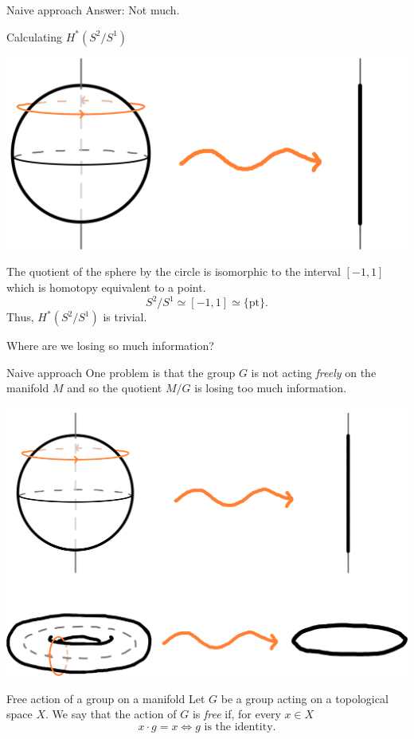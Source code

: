 \documentclass{beamer}
\begin{document}
\begin{frame}{Naive approach}
Answer: Not much.
\begin{exampleblock}{Calculating $H^{*}(S^{2}/S^{1})$}
\begin{center}
\includegraphics[scale=0.04]{"quotient"}
\end{center}
The quotient of the sphere by the circle is isomorphic to the interval $[-1,1]$ which is homotopy equivalent to a point.
\[
S^{2}/S^{1} \simeq [-1,1] \simeq \{\mathrm{pt}\}.
\]
Thus, $H^{*}(S^{2}/S^{1})$ is trivial.
\end{exampleblock}
Where are we losing so much information?
\end{frame}


\begin{frame}{Naive approach}
One problem is that the group $G$ is not acting \emph{freely} on the manifold $M$ and so the quotient $M/G$ is losing too much information.
\begin{center}
\includegraphics[scale=0.04]{"quotient2"}
\end{center}
\begin{block}{Free action of a group on a manifold}
Let $G$ be a group acting on a topological space $X$. We say that the action of $G$ is \emph{free} if, for every $x \in X$
\[
x \cdot g = x \iff g \text{ is the identity}.
\]
\end{block}
\end{frame}
\end{document}

